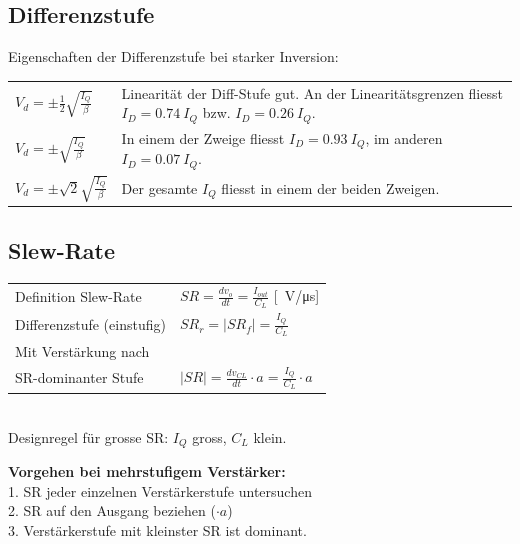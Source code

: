 \subsection{Differenzstufe}
Eigenschaften der Differenzstufe bei starker Inversion:\\
\begin{tabular}{ll}
	$V_d = \pm \frac{1}{2}\sqrt{\frac{I_Q}{\beta}}$& Linearität der Diff-Stufe gut. An der Linearitätsgrenzen fliesst $I_D = \SI{0.74}{I_Q}$ bzw. $I_D = \SI{0.26}{I_Q}$.\\
	$V_d = \pm\sqrt{\frac{I_Q}{\beta}}$& In einem der Zweige fliesst $I_D = \SI{0.93}{I_Q}$, im anderen $I_D = \SI{0.07}{I_Q}$.\\
	$V_d = \pm\sqrt{2}\sqrt{\frac{I_Q}{\beta}}$& Der gesamte $I_Q$ fliesst in einem der beiden Zweigen.
\end{tabular}

\subsection{Slew-Rate}
\begin{minipage}[c]{0.5\textwidth}
	\begin{tabular}{ll}
		Definition Slew-Rate&$SR=\frac{dv_o}{dt}=\frac{I_{out}}{C_L}$ [\SI{}{\volt/\micro\second}]\\
		Differenzstufe (einstufig)& $SR_r = |SR_f|=\frac{I_Q}{C_L}$\\
		Mit Verstärkung nach&\\
		 SR-dominanter Stufe&$|SR|=\frac{dv_{CL}}{dt}\cdot a= \frac{I_Q}{C_L}\cdot a$
	\end{tabular}\\
	Designregel für grosse SR: $I_Q$ gross, $C_L$ klein.
\end{minipage}
\begin{minipage}[c]{0.5\textwidth}
	\textbf{Vorgehen bei mehrstufigem Verstärker:}\\
	1. SR jeder einzelnen Verstärkerstufe untersuchen\\
	2. SR auf den Ausgang beziehen ($\cdot a$)\\
	3. Verstärkerstufe mit kleinster SR ist dominant.
\end{minipage}

